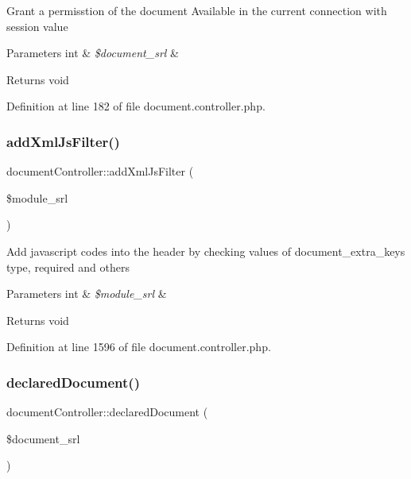 Grant a permisstion of the document Available in the current connection with session value 
\begin{DoxyParams}[1]{Parameters}
int & {\em \$document\+\_\+srl} & \\
\hline
\end{DoxyParams}
\begin{DoxyReturn}{Returns}
void 
\end{DoxyReturn}


Definition at line 182 of file document.\+controller.\+php.

\hypertarget{classdocumentController_a1fe6155cfd253e19d0583cc74a2cab35}{}\label{classdocumentController_a1fe6155cfd253e19d0583cc74a2cab35} 
\subsubsection{\texorpdfstring{add\+Xml\+Js\+Filter()}{addXmlJsFilter()}}
{\footnotesize\ttfamily document\+Controller\+::add\+Xml\+Js\+Filter (\begin{DoxyParamCaption}\item[{}]{\$module\+\_\+srl }\end{DoxyParamCaption})}

Add javascript codes into the header by checking values of document\+\_\+extra\+\_\+keys type, required and others 
\begin{DoxyParams}[1]{Parameters}
int & {\em \$module\+\_\+srl} & \\
\hline
\end{DoxyParams}
\begin{DoxyReturn}{Returns}
void 
\end{DoxyReturn}


Definition at line 1596 of file document.\+controller.\+php.

\hypertarget{classdocumentController_aa2cdd129c5f882d535e39728761d4168}{}\label{classdocumentController_aa2cdd129c5f882d535e39728761d4168} 
\subsubsection{\texorpdfstring{declared\+Document()}{declaredDocument()}}
{\footnotesize\ttfamily document\+Controller\+::declared\+Document (\begin{DoxyParamCaption}\item[{}]{\$document\+\_\+srl }\end{DoxyParamCaption})}

